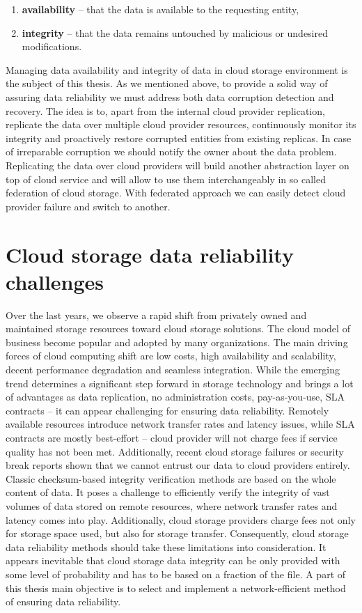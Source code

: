 \begin{enumerate}
\item \textbf{availability} -- that the data is available to the requesting entity,
\item \textbf{integrity} -- that the data remains untouched by malicious or undesired
modifications.
\end{enumerate}

Managing data availability and integrity of data in cloud storage environment is the
subject of this thesis. As we mentioned above, to provide a solid way of assuring data
reliability we must address both data corruption detection and recovery. The idea is
to, apart from the internal cloud provider replication, replicate the data over multiple
cloud provider resources, continuously monitor its integrity and proactively restore corrupted
entities from existing replicas. In case of irreparable corruption we should notify the
owner about the data problem. Replicating the data over cloud providers will build another
abstraction layer on top of cloud service and will allow to use them interchangeably in so
called federation of cloud storage. With federated approach we can easily detect cloud provider
failure and switch to another.

\section{Cloud storage data reliability challenges}

Over the last years, we observe a rapid shift from privately owned and maintained
storage resources toward cloud storage solutions. The cloud model of business become
popular and adopted by many organizations. The main driving forces of cloud computing
shift are low costs, high availability and scalability, decent performance degradation
and seamless integration. While the emerging trend determines a significant step forward 
in storage technology and brings a lot of advantages as data replication, no administration
costs, pay-as-you-use, SLA contracts -- it can appear challenging for ensuring data 
reliability. Remotely available resources introduce network transfer rates and latency issues,
while SLA contracts are mostly best-effort -- cloud provider will not charge fees if service
quality has not been met. Additionally, recent cloud storage failures or security break
reports shown that we cannot entrust our data to cloud providers entirely.\\
 
Classic checksum-based integrity verification methods are based on the whole content of data. It
poses a challenge to efficiently verify the integrity of vast volumes of data stored on remote resources,
where network transfer rates and latency comes into play. Additionally, cloud
storage providers charge fees not only for storage space used, but also for storage transfer.
Consequently, cloud storage data reliability methods should take these limitations into
consideration. It appears inevitable that cloud storage data integrity can be only provided with
some level of probability and has to be based on a fraction of the file. A part of this thesis main
objective is to select and implement a network-efficient method of ensuring data reliability.


